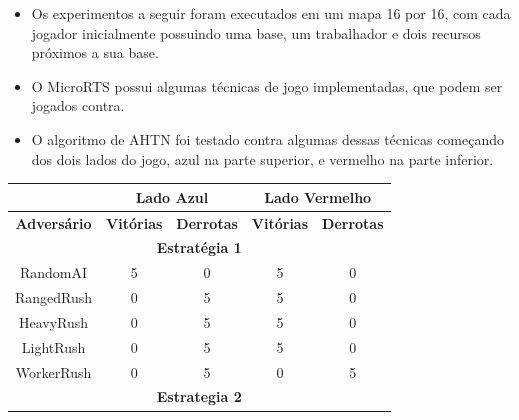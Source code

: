 \documentclass[a0,portrait]{a0poster}
\begin{document}
\begin{multicols}{2}
	\begin{itemize}
		\item Os experimentos a seguir foram executados em um mapa 16 por 16, com cada jogador inicialmente possuindo uma base, um trabalhador e dois recursos próximos a sua base. 
		\cite{nau2003shop2}\cite{ontanon2013combinatorial}\cite{ontanon2015adversarial}
		\item O MicroRTS possui algumas técnicas de jogo implementadas, que podem ser jogados contra.
		\item O algoritmo de AHTN foi testado contra algumas dessas técnicas começando dos dois lados do jogo, azul na parte superior, e vermelho na parte inferior.
	\end{itemize}
	
	\vspace{8mm}
	{\large
	\begin{center}
		\begin{tabular}{|c|cc|cc|}
			\hline
			\textbf{}           & \multicolumn{2}{c|}{\textbf{Lado Azul}}                    & \multicolumn{2}{c|}{\textbf{Lado Vermelho}}                \\ \hline
				\textbf{Adversário} & \multicolumn{1}{c|}{\textbf{Vitórias}} & \textbf{Derrotas} & \multicolumn{1}{c|}{\textbf{Vitórias}} & \textbf{Derrotas} \\ \hline
				\multicolumn{5}{|c|}{\textbf{Estrat\'egia 1}}                                                                                                   \\ \hline
				RandomAI              & 5                                      & 0                 & 5                                      & 0                 \\
				RangedRush              & 0                                      & 5                 & 5                                      & 0                 \\
				HeavyRush               & 0                                      & 5                 & 5                                      & 0                 \\
				LightRush               & 0                                      & 5                 & 5                                      & 0                 \\
				WorkerRush              & 0                                      & 5                 & 0                                      & 5                 \\ \hline
				\multicolumn{5}{|c|}{\textbf{Estrategia 2}}                                                                                                   \\ \hline

\end{tabular}
\end{center}}
\end{multicols}
\end{document}
